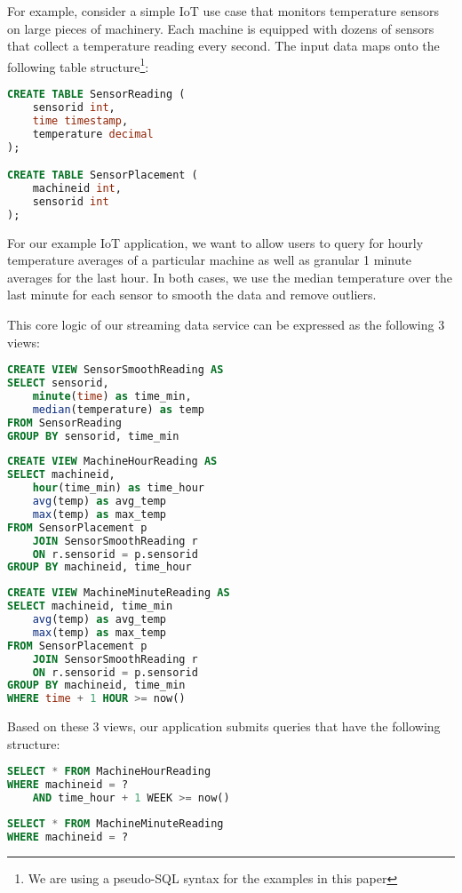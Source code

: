 \documentclass[	DIV=calc,%
							paper=letter,%
							fontsize=11pt,%
							twocolumn]{scrartcl}	 					%
\begin{document}
For example, consider a simple IoT use case that monitors temperature sensors on large pieces of machinery. Each machine is equipped with dozens of sensors that collect a temperature reading every second. The input data maps onto the following table structure\footnote{We are using a pseudo-SQL syntax for the examples in this paper}:
\begin{lstlisting}[language=SQL]
CREATE TABLE SensorReading (
    sensorid int,
    time timestamp,
    temperature decimal
);

CREATE TABLE SensorPlacement (
    machineid int,
    sensorid int
);
\end{lstlisting}

For our example IoT application, we want to allow users to query for hourly temperature averages of a particular machine as well as granular 1 minute averages for the last hour. In both cases, we use the median temperature over the last minute for each sensor to smooth the data and remove outliers.

This core logic of our streaming data service can be expressed as the following 3 views:

\begin{lstlisting}[language=SQL]
CREATE VIEW SensorSmoothReading AS
SELECT sensorid,
    minute(time) as time_min,
    median(temperature) as temp
FROM SensorReading
GROUP BY sensorid, time_min
\end{lstlisting}

\begin{lstlisting}[language=SQL]
CREATE VIEW MachineHourReading AS
SELECT machineid,
    hour(time_min) as time_hour
    avg(temp) as avg_temp
    max(temp) as max_temp
FROM SensorPlacement p
    JOIN SensorSmoothReading r
    ON r.sensorid = p.sensorid
GROUP BY machineid, time_hour
\end{lstlisting}

\begin{lstlisting}[language=SQL]
CREATE VIEW MachineMinuteReading AS
SELECT machineid, time_min
    avg(temp) as avg_temp
    max(temp) as max_temp
FROM SensorPlacement p
    JOIN SensorSmoothReading r
    ON r.sensorid = p.sensorid
GROUP BY machineid, time_min
WHERE time + 1 HOUR >= now()
\end{lstlisting}

Based on these 3 views, our application submits queries that have the following structure:
\begin{lstlisting}[language=SQL]
SELECT * FROM MachineHourReading
WHERE machineid = ?
    AND time_hour + 1 WEEK >= now()
\end{lstlisting}
\begin{lstlisting}[language=SQL]
SELECT * FROM MachineMinuteReading
WHERE machineid = ?
\end{lstlisting}
\end{document}
